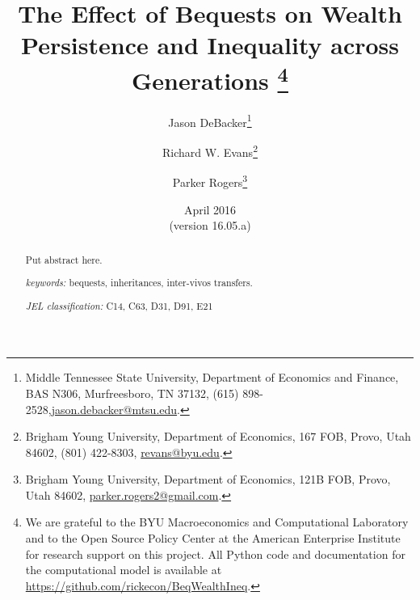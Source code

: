 \documentclass[letterpaper,12pt]{article}
\theoremstyle{definition}
\begin{document}
\begin{titlepage}
\title{The Effect of Bequests on Wealth Persistence and Inequality across Generations
       \thanks{
       We are grateful to the BYU Macroeconomics and Computational Laboratory and to the Open Source Policy Center at the American Enterprise Institute for research support on this project. All Python code and documentation for the computational model is available at \href{https://github.com/rickecon/BeqWealthIneq}{https://github.com/rickecon/BeqWealthIneq}.}
       }
\author{
  Jason DeBacker\footnote{Middle Tennessee State University, Department of Economics and Finance, BAS N306, Murfreesboro, TN 37132, (615) 898-2528,\href{mailto:jason.debacker@mtsu.edu}{jason.debacker@mtsu.edu}.} \\[-2pt]
  \and
  Richard W. Evans\footnote{Brigham Young University, Department of Economics, 167 FOB, Provo, Utah 84602, (801) 422-8303, \href{mailto:revans@byu.edu}{revans@byu.edu}.} \\[-2pt]
  \and
  Parker Rogers\footnote{Brigham Young University, Department of Economics, 121B FOB, Provo, Utah 84602, \href{mailto:parker.rogers2@gmail.com}{parker.rogers2@gmail.com}.} \\[-2pt]}
\date{April 2016 \\
  \scriptsize{(version 16.05.a)}}
\maketitle
\vspace{-9mm}
\begin{abstract}
\small{Put abstract here.

\vspace{3mm}

\noindent\textit{keywords:}\: bequests, inheritances, inter-vivos transfers.

\vspace{3mm}

\noindent\textit{JEL classification:} C14, C63, D31, D91, E21}
\end{abstract}
\thispagestyle{empty}
\end{titlepage}
\end{document}
